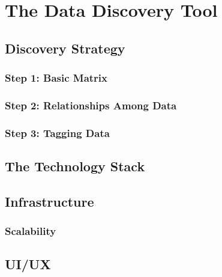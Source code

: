 \chapter{The Data Discovery Tool}\label{ch:ch2label}

\section{Discovery Strategy}

\subsection{Step 1: Basic Matrix}

\subsection{Step 2: Relationships Among Data}

\subsection{Step 3: Tagging Data}

\section{The Technology Stack}

\section{Infrastructure}

\subsection{Scalability}

\section{UI/UX}